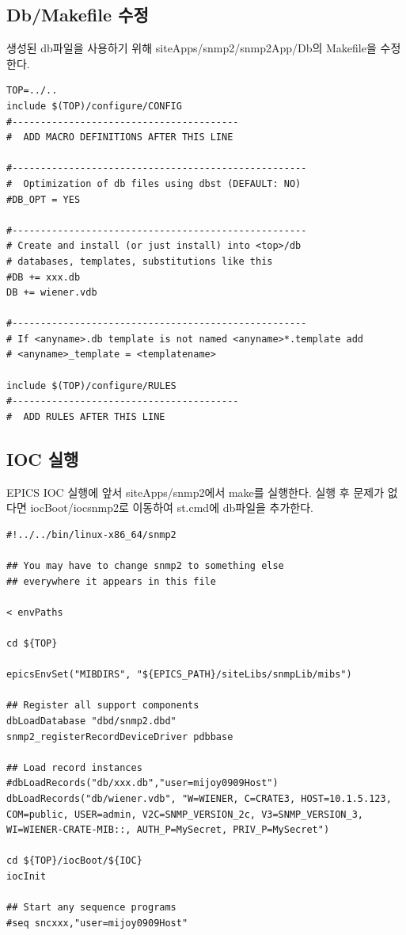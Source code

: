 \documentclass[11pt
  , a4paper
  , article
  , oneside
]{memoir}
\begin{document}
\subsection{Db/Makefile 수정}
생성된 db파일을 사용하기 위해 siteApps/snmp2/snmp2App/Db의 Makefile을 수정한다.

\begin{lstlisting}[style=termstylenumber]
TOP=../..
include $(TOP)/configure/CONFIG
#----------------------------------------
#  ADD MACRO DEFINITIONS AFTER THIS LINE

#----------------------------------------------------
#  Optimization of db files using dbst (DEFAULT: NO)
#DB_OPT = YES

#----------------------------------------------------
# Create and install (or just install) into <top>/db
# databases, templates, substitutions like this
#DB += xxx.db
DB += wiener.vdb

#----------------------------------------------------
# If <anyname>.db template is not named <anyname>*.template add
# <anyname>_template = <templatename>

include $(TOP)/configure/RULES
#----------------------------------------
#  ADD RULES AFTER THIS LINE
\end{lstlisting}

\subsection{IOC 실행}
EPICS IOC 실행에 앞서 siteApps/snmp2에서 make를 실행한다. 실행 후 문제가 없다면 iocBoot/iocsnmp2로 이동하여 st.cmd에 db파일을 추가한다.

\begin{lstlisting}[style=termstylenumber]
#!../../bin/linux-x86_64/snmp2

## You may have to change snmp2 to something else
## everywhere it appears in this file

< envPaths

cd ${TOP}

epicsEnvSet("MIBDIRS", "${EPICS_PATH}/siteLibs/snmpLib/mibs")

## Register all support components
dbLoadDatabase "dbd/snmp2.dbd"
snmp2_registerRecordDeviceDriver pdbbase

## Load record instances
#dbLoadRecords("db/xxx.db","user=mijoy0909Host")
dbLoadRecords("db/wiener.vdb", "W=WIENER, C=CRATE3, HOST=10.1.5.123, COM=public, USER=admin, V2C=SNMP_VERSION_2c, V3=SNMP_VERSION_3, WI=WIENER-CRATE-MIB::, AUTH_P=MySecret, PRIV_P=MySecret")

cd ${TOP}/iocBoot/${IOC}
iocInit

## Start any sequence programs
#seq sncxxx,"user=mijoy0909Host"
\end{lstlisting}
\end{document}
